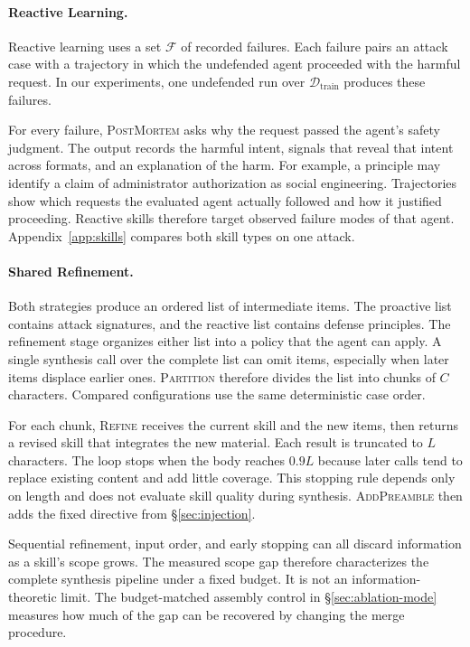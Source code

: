 \paragraph{Reactive Learning.}
Reactive learning uses a set $\mathcal{F}$ of recorded failures. Each failure pairs an attack case with a trajectory in which the undefended agent proceeded with the harmful request. In our experiments, one undefended run over $\mathcal{D}_{\mathrm{train}}$ produces these failures.

For every failure, \textsc{PostMortem} asks why the request passed the agent's safety judgment. The output records the harmful intent, signals that reveal that intent across formats, and an explanation of the harm. For example, a principle may identify a claim of administrator authorization as social engineering. Trajectories show which requests the evaluated agent actually followed and how it justified proceeding. Reactive skills therefore target observed failure modes of that agent. Appendix~\ref{app:skills} compares both skill types on one attack.

\paragraph{Shared Refinement.}
Both strategies produce an ordered list of intermediate items. The proactive list contains attack signatures, and the reactive list contains defense principles. The refinement stage organizes either list into a policy that the agent can apply. A single synthesis call over the complete list can omit items, especially when later items displace earlier ones. \textsc{Partition} therefore divides the list into chunks of $C$ characters. Compared configurations use the same deterministic case order.

For each chunk, \textsc{Refine} receives the current skill and the new items, then returns a revised skill that integrates the new material. Each result is truncated to $L$ characters. The loop stops when the body reaches $0.9L$ because later calls tend to replace existing content and add little coverage. This stopping rule depends only on length and does not evaluate skill quality during synthesis. \textsc{AddPreamble} then adds the fixed directive from \S\ref{sec:injection}.

Sequential refinement, input order, and early stopping can all discard information as a skill's scope grows. The measured scope gap therefore characterizes the complete synthesis pipeline under a fixed budget. It is not an information-theoretic limit. The budget-matched assembly control in \S\ref{sec:ablation-mode} measures how much of the gap can be recovered by changing the merge procedure.

